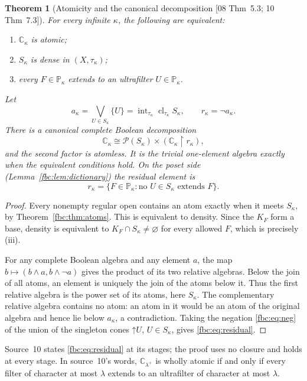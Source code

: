 \documentclass[11pt,letterpaper]{article}
\newtheorem{theorem}{Theorem}[section]
\theoremstyle{definition}
\theoremstyle{remark}
\newcommand{\C}{\mathbb C}
\newcommand{\PP}{\mathbb P}
\newcommand{\pow}{\mathcal P}
\newcommand{\up}{\mathord{\uparrow}}
\newcommand{\Int}{\operatorname{int}}
\newcommand{\Cl}{\operatorname{cl}}
\newcommand{\res}{\mathbin{\upharpoonright}}
\newcommand{\src}[1]{\textup{[#1]}}
\begin{document}
\begin{theorem}[Atomicity and the canonical decomposition \src{08 Thm~5.3; 10 Thm~7.3}]
\label{fbc:thm:atomicity}
For every infinite $\kappa$, the following are equivalent:
\begin{enumerate}[label=\textup{(\roman*)}]
\item $\C_\kappa$ is atomic;
\item $S_\kappa$ is dense in $(X,\tau_\kappa)$;
\item every $F\in\PP_\kappa$ extends to an ultrafilter
$U\in\PP_\kappa$.
\end{enumerate}
Let
\[
 a_\kappa=\bigvee_{U\in S_\kappa}\{U\}
          =\Int_{\tau_\kappa}\Cl_{\tau_\kappa}S_\kappa,
 \qquad r_\kappa=\neg a_\kappa.
\]
There is a canonical complete Boolean decomposition
\begin{equation}\label{fbc:eq:atomic-split}
 \C_\kappa\cong\pow(S_\kappa)\times
       (\C_\kappa\res r_\kappa),
\end{equation}
and the second factor is atomless. It is the trivial one-element
algebra exactly when the equivalent conditions hold. On the poset side
(Lemma~\ref{fbc:lem:dictionary}) the residual element is
\begin{equation}\label{fbc:eq:residual}
 r_\kappa=
 \{F\in\PP_\kappa:\text{no }U\in S_\kappa\text{ extends }F\}.
\end{equation}
\end{theorem}
\begin{proof}
Every nonempty regular open contains an atom exactly when it meets
$S_\kappa$, by Theorem~\ref{fbc:thm:atoms}. This is equivalent to
density. Since the $K_F$ form a base, density is equivalent to
$K_F\cap S_\kappa\ne\varnothing$ for every allowed $F$, which
is precisely \textup{(iii)}.

For any complete Boolean algebra and any element $a$, the map
$b\mapsto(b\wedge a,b\wedge\neg a)$ gives the product of its two
relative algebras. Below the join of all atoms, an element is uniquely
the join of the atoms below it. Thus the first relative algebra is
the power set of its atoms, here $S_\kappa$. The complementary
relative algebra contains no atom: an atom in it would be an atom
of the original algebra and hence lie below $a_\kappa$, a contradiction.
Taking the negation \eqref{fbc:eq:neg} of the union of the singleton
cones $\up U$, $U\in S_\kappa$, gives \eqref{fbc:eq:residual}.
\end{proof}

Source~10 states \eqref{fbc:eq:residual} at its stages; the proof uses no
closure and holds at every stage. In source~10's words, $\C_{\lambda^+}$
is wholly atomic if and only if every filter of character at most
$\lambda$ extends to an ultrafilter of character at most $\lambda$.
\end{document}

